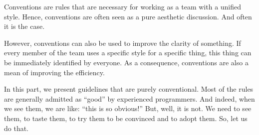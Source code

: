 
Conventions are rules that are necessary for working as a team with a unified style.
Hence, conventions are often seen as a pure aesthetic discussion.
And often it is the case.

However, conventions can also be used to improve the clarity of something.
If every member of the team uses a specific style for a specific thing, this thing can be immediately identified by everyone.
As a consequence, conventions are also a mean of improving the efficiency.


In this part, we present guidelines that are purely conventional.
Most of the rules are generally admitted as \enquote{good} by experienced programmers.
And indeed, when we see them, we are like: \enquote{this is so obvious!}
But, well, it is not.
We need to see them, to taste them, to try them to be convinced and to adopt them.
So, let us do that.